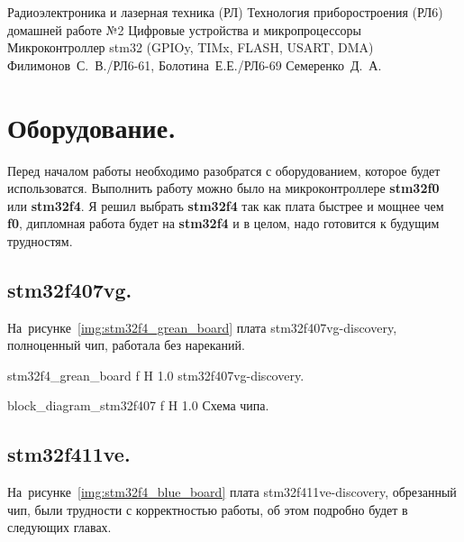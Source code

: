 \documentclass{bmstu}
\begin{document}
	\makereporttitle
	{Радиоэлектроника и лазерная техника (РЛ)} %
	{Технология приборостроения (РЛ6)} %
	{домашней работе №2} %
	{Цифровые устройства и микропроцессоры} %
	{Микроконтроллер stm32 (GPIOy, TIMx, FLASH, USART, DMA)} %
	{} %
	{Филимонов~С.~В./РЛ6-61, Болотина~Е.Е./РЛ6-69} %
	{Семеренко~Д.~А.} %
	
	\tableofcontents
	\chapter{Оборудование.}
	
	Перед началом работы необходимо разобратся с оборудованием, которое будет использоватся.
	Выполнить работу можно было на микроконтроллере \textbf{stm32f0} или \textbf{stm32f4}. 
	Я решил выбрать \textbf{stm32f4} так как плата быстрее и мощнее чем \textbf{f0}, дипломная работа будет на \textbf{stm32f4} и в целом, надо готовится к будущим трудностям.
	
	\section{stm32f407vg.}
	
	На~рисунке~\ref{img:stm32f4_grean_board} плата stm32f407vg-discovery, полноценный чип, работала без нареканий.
	
	{stm32f4_grean_board} %
	{f} %
	{H} %
	{1.0\textwidth} %
	{stm32f407vg-discovery.}
	
	{block_diagram_stm32f407} %
	{f} %
	{H} %
	{1.0\textwidth} %
	{Схема чипа.}
	
	\section{stm32f411ve.}
	
	На~рисунке~\ref{img:stm32f4_blue_board} плата stm32f411ve-discovery, обрезанный чип, были трудности с корректностью работы, об этом подробно будет в следующих главах.
	
\end{document}
